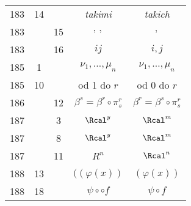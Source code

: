 \documentclass[a4paper,11pt]{article}
\numberwithin{equation}{section}
\begin{document}
\begin{center}
\begin{tabular}{|c|c|c|c|c|}
    183 & 14 & & \textit{takimi} & \textit{takich} \\
    183 & & 15 & $,\, ,$ & $,$ \\
    183 & & 16 & $ij$ & $i, j$ \\
    185 & \hphantom{0}1 & & $\nu_{ 1 },\!\ldots,\! \mu_{ n }$
           & $\nu_{ 1 }, \ldots, \mu_{ n }$ \\
    185 & 10 & & od 1 do $r$ & od 0 do $r$ \\
    186 & & 12 & $\beta^{ s } = \beta^{ r } \circ \pi^{ r }_{ s }$
    & $\beta^{ r } = \beta^{ s } \circ \pi^{ r }_{ s }$ \\
    187 & & \hphantom{0}3 & $\Rcal^{ y }$ & $\Rcal^{ m }$ \\
    187 & & \hphantom{0}8 & $\Rcal^{ y }$ & $\Rcal^{ m }$ \\
    187 & & 11 & $R^{ n }$ & $\Rcal^{ n }$ \\
    188 & 13 & & $( ( \varphi( x ) )$ & $( \varphi( x ) )$ \\
    188 & 18 & & $\psi \circ \circ f$ & $\psi \circ f$ \\
    \hline
  \end{tabular}





  \newpage


\end{center}
\end{document}
